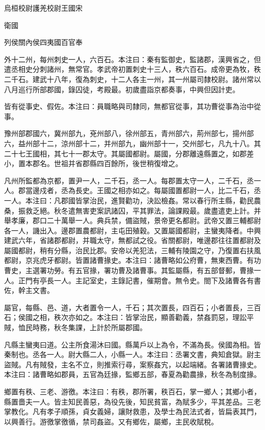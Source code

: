 
\begin{pinyinscope}
烏桓校尉護羌校尉王國宋

衛國

列侯關內侯四夷國百官奉

外十二州，每州刺史一人，六百石。本注曰：秦有監御史，監諸郡，漢興省之，但遣丞相史分刺諸州，無常官。孝武帝初置刺史十三人，秩六百石。成帝更為牧，秩二千石。建武十八年，復為刺史，十二人各主一州，其一州屬司隸校尉。諸州常以八月巡行所部郡國，錄囚徒，考殿最。初歲盡詣京都奏事，中興但因計吏。

皆有從事史、假佐。本注曰：員職略與司隸同，無都官從事，其功曹從事為治中從事。

豫州部郡國六，冀州部九，兗州部八，徐州部五，青州部六，荊州部七，揚州部六，益州部十二，涼州部十二，并州部九，幽州部十一，交州部七，凡九十八。其二十七王國相，其七十一郡太守。其屬國都尉。屬國，分郡離遠縣置之，如郡差小，置本郡名。世祖并省郡縣四百餘所，後世稍復增之。

凡州所監都為京都，置尹一人，二千石，丞一人。每郡置太守一人，二千石，丞一人。郡當邊戍者，丞為長史。王國之相亦如之。每屬國置都尉一人，比二千石，丞一人。本注曰：凡郡國皆掌治民，進賢勸功，決訟檢姦。常以春行所主縣，勸民農桑，振救乏絕。秋冬遣無害吏案訊諸囚，平其罪法，論課殿最。歲盡遣吏上計。并舉孝廉，郡口二十萬舉一人。典兵禁，備盜賊，景帝更名都尉。武帝又置三輔都尉各一人，譏出入。邊郡置農都尉，主屯田殖穀。又置屬國都尉，主蠻夷降者。中興建武六年，省諸郡都尉，并職太守，無都試之役。省關都尉，唯邊郡往往置都尉及屬國都尉，稍有分縣，治民比郡。安帝以羌犯法，三輔有陵園之守，乃復置右扶風都尉，京兆虎牙都尉。皆置諸曹掾史。本注曰：諸曹略如公府曹，無東西曹。有功曹史，主選署功勞。有五官掾，署功曹及諸曹事。其監屬縣，有五部督郵，曹掾一人。正門有亭長一人。主記室史，主錄記書，催期會。無令史。閤下及諸曹各有書佐，幹主文書。

屬官，每縣、邑、道，大者置令一人，千石；其次置長，四百石；小者置長，三百石；侯國之相，秩次亦如之。本注曰：皆掌治民，顯善勸義，禁姦罰惡，理訟平賊，恤民時務，秋冬集課，上計於所屬郡國。

凡縣主蠻夷曰道。公主所食湯沐曰國。縣萬戶以上為令，不滿為長。侯國為相。皆秦制也。丞各一人。尉大縣二人，小縣一人。本注曰：丞署文書，典知倉獄。尉主盜賊。凡有賊發，主名不立，則推索行尋，案察姦宄，以起端緒。各署諸曹掾史。本注曰：諸曹略如郡員，五官為廷掾，監鄉五部，春夏為勸農掾，秋冬為制度掾。

鄉置有秩、三老、游徼。本注曰：有秩，郡所署，秩百石，掌一鄉人；其鄉小者，縣置嗇夫一人。皆主知民善惡，為役先後，知民貧富，為賦多少，平其差品。三老掌教化。凡有孝子順孫，貞女義婦，讓財救患，及學士為民法式者，皆扁表其門，以興善行。游徼掌徼循，禁司姦盜。又有鄉佐，屬鄉，主民收賦稅。


\end{pinyinscope}

